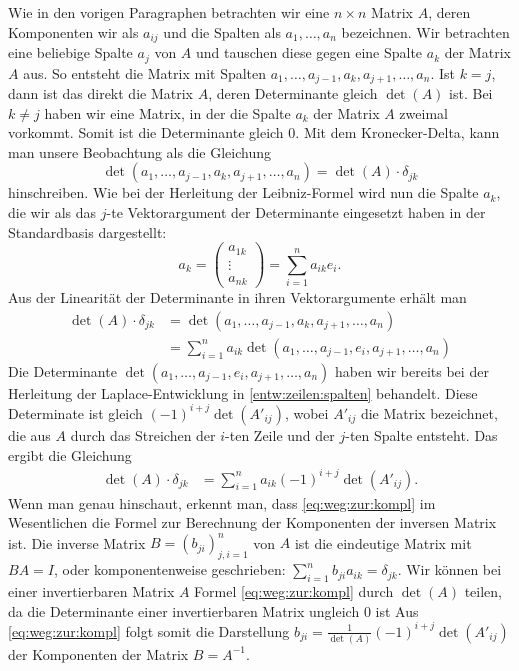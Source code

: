 Wie in den vorigen Paragraphen betrachten wir eine $n \times n$ Matrix $A$, deren Komponenten wir als $a_{ij}$ und die Spalten als $a_1,\ldots,a_n$ bezeichnen.  Wir betrachten eine beliebige Spalte $a_j$ von $A$ und tauschen diese gegen eine Spalte $a_k$ der Matrix $A$ aus. So entsteht die Matrix mit Spalten $a_1,\ldots,a_{j-1},a_k,a_{j+1},\ldots,a_n$. Ist $k=j$, dann ist das direkt die Matrix $A$, deren Determinante gleich $\det(A)$ ist. Bei $k \ne j$ haben wir eine Matrix, in der die Spalte $a_k$ der Matrix $A$ zweimal vorkommt. Somit ist die Determinante gleich $0$. Mit dem Kronecker-Delta, kann man unsere Beobachtung als  die Gleichung 
\begin{equation*}
	\det(a_1, \ldots, a_{j-1}, a_k, a_{j+1}, \ldots ,a_n) = \det(A) \cdot \delta_{jk}
\end{equation*}
hinschreiben. Wie bei der Herleitung der Leibniz-Formel wird nun die Spalte $a_k$, die wir als das $j$-te Vektorargument der Determinante eingesetzt haben in der Standardbasis dargestellt: 
\[
	a_k = \begin{pmatrix} a_{1k} \\ \vdots \\ a_{nk} \end{pmatrix} = \sum_{i=1}^n a_{ik} e_i.
\]
Aus der Linearität der Determinante in ihren Vektorargumente erhält man
\begin{align*}
	\det(A) \cdot \delta_{jk} & = \det(a_1,\ldots,a_{j-1},a_k,a_{j+1},\ldots,a_n)
	\\ & = \sum_{i=1}^{n} a_{ik} \det(a_1, \ldots, a_{j-1}, e_i, a_{j+1}, \ldots, a_n)
\end{align*}
Die Determinante $\det(a_1,\ldots,a_{j-1},e_i,a_{j+1},\ldots,a_n)$ haben wir bereits bei der Herleitung der Laplace-Entwicklung in \ref{entw:zeilen:spalten} behandelt. Diese Determinate ist gleich $(-1)^{i+j} \det(A'_{ij})$, wobei $A'_{ij}$  die Matrix bezeichnet, die aus $A$ durch das Streichen der $i$-ten Zeile und der $j$-ten Spalte entsteht. Das ergibt die Gleichung
\begin{align}
	\label{eq:weg:zur:kompl}
	\det(A) \cdot \delta_{jk} 
	&= \sum_{i=1}^{n} a_{ik} (-1)^{i+j} \det(A'_{ij}).
\end{align}
Wenn man genau hinschaut, erkennt man, dass \eqref{eq:weg:zur:kompl} im Wesentlichen die Formel zur Berechnung der Komponenten der inversen Matrix ist. Die inverse Matrix $B = (b_{ji})_{j,i=1}^n$ von $A$ ist die eindeutige Matrix mit $B A = I$, oder komponentenweise geschrieben: $\sum_{i=1}^n b_{ji} a_{ik} = \delta_{jk}$. Wir können bei einer invertierbaren Matrix $A$ Formel \eqref{eq:weg:zur:kompl} durch $\det(A)$ teilen, da die Determinante einer invertierbaren Matrix ungleich $0$ ist Aus  \eqref{eq:weg:zur:kompl} folgt somit die Darstellung $b_{ji} = \frac{1}{\det(A)} (-1)^{i+j} \det(A'_{ij})$ der Komponenten der Matrix $B = A^{-1}$. 

